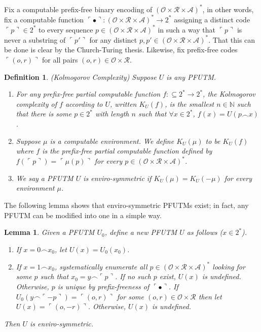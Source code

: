 \documentclass{article}
\newtheorem{definition}[theorem]{Definition}
\newtheorem{lemma}[theorem]{Lemma}
\begin{document}
Fix a computable prefix-free binary encoding of
$(\mathcal O\times \mathcal R\times\mathcal A)^*$, in other words,
fix a computable function
$\ulcorner\bullet\urcorner:(\mathcal O\times \mathcal R\times\mathcal A)^*\to 2^*$
assigning a distinct code $\ulcorner p\urcorner\in 2^*$ to every sequence
$p\in (\mathcal O\times \mathcal R\times\mathcal A)^*$ in such a way that
$\ulcorner p\urcorner$ is never a substring of $\ulcorner p'\urcorner$
for any distinct $p,p'\in (\mathcal O\times \mathcal R\times\mathcal A)^*$.
That this can be done is clear by the Church-Turing thesis.
Likewise, fix prefix-free codes $\ulcorner (o,r)\urcorner$ for all
pairs $(o,r)\in\mathcal O\times\mathcal R$.

\begin{definition}
(Kolmogorov Complexity)
Suppose $U$ is any PFUTM.
\begin{enumerate}
    \item
    For any prefix-free partial computable function $f: \subseteq 2^*\to 2^*$, the
    \emph{Kolmogorov complexity of $f$ according to $U$},
    written $K_U(f)$, is the smallest $n\in\mathbb N$ such that
    there is some $p\in 2^*$ with length $n$ such that
    $\forall x\in 2^*$, $f(x)=U(p\frown x)$.
    \item
    Suppose $\mu$ is a computable environment.
    We define $K_U(\mu)$ to be $K_U(f)$ where $f$
    is the prefix-free partial computable function defined by
    $f(\ulcorner p\urcorner)=\ulcorner \mu(p)\urcorner$
    for every $p\in (\mathcal O\times \mathcal R\times\mathcal A)^*$.
    \item
    We say a PFUTM $U$ is \emph{enviro-symmetric} if
    $K_U(\mu)=K_U(-\mu)$ for every environment $\mu$.
\end{enumerate}
\end{definition}

The following lemma shows that enviro-symmetric PFUTMs exist; in fact, any PFUTM
can be modified into one in a simple way.

\begin{lemma}
    Given a PFUTM $U_0$, define a new PFUTM $U$ as follows ($x\in 2^*$).
    \begin{enumerate}
        \item If $x=0\frown x_0$, let $U(x)=U_0(x_0)$.
        \item If $x=1\frown x_0$, systematically enumerate all
        $p\in (\mathcal O\times \mathcal R\times\mathcal A)^*$
        looking for some $p$ such that $x_0=y\frown \ulcorner p\urcorner$.
        If no such $p$ exist, $U(x)$ is undefined.
        Otherwise, $p$ is unique by prefix-freeness of $\ulcorner\bullet\urcorner$.
        If $U_0(y\frown\ulcorner -p\urcorner)=\ulcorner (o,r)\urcorner$
        for some $(o,r)\in\mathcal O\times\mathcal R$ then
        let $U(x)=\ulcorner (o,-r)\urcorner$. Otherwise, $U(x)$ is undefined.
    \end{enumerate}
    Then $U$ is enviro-symmetric.
\end{lemma}
\end{document}
